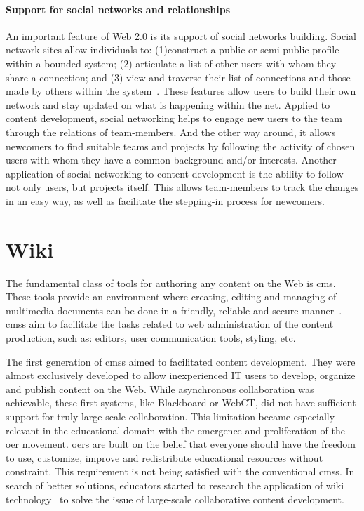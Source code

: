 \documentclass[PhD, Submit, ngerman,UKenglish,table]{scrbook}
\begin{document}
\paragraph{Support for social networks and relationships}
An important feature of Web 2.0 is its support of social networks building.
Social network sites allow individuals to: (1)construct a public or semi-public profile within a bounded system; (2) articulate a list of other users with whom they share a connection; and (3) view and traverse their list of connections and those made by others within the system~\cite{JCC4:JCC4393}.
These features allow users to build their own network and stay updated on what is happening within the net.
Applied to content development, social networking helps to engage new users to the team through the relations of team-members.
And the other way around, it allows newcomers to find suitable teams and projects by following the activity of chosen users with whom they have a common background and/or interests.
Another application of social networking to content development is the ability to follow not only users, but projects itself.
This allows team-members to track the changes in an easy way, as well as facilitate the stepping-in process for newcomers.


\section{Wiki}
\label{sec:wiki}
The fundamental class of tools for authoring any content on the Web is \gls{cms}.
These tools provide an environment where creating, editing and managing of multimedia documents can be done in a friendly, reliable and secure manner~\cite{Rivera2010}.
\gls{cms}s aim to facilitate the tasks related to web administration of the content production, such as: editors, user communication tools, styling, etc.

The first generation of \gls{cms}s aimed to facilitated content development. They were almost exclusively developed to allow inexperienced IT users to develop, organize and publish content on the Web. 
While asynchronous collaboration was achievable, these first systems, like Blackboard or WebCT, did not have sufficient support for truly large-scale collaboration.
This limitation became especially relevant in the educational domain with the emergence and proliferation of the \gls{oer} movement.
\gls{oer}s are built on the belief that everyone should have the freedom to use, customize, improve and redistribute educational resources without constraint. 
This requirement is not being satisfied with the conventional \gls{cms}s.
In search of better solutions, educators started to research the application of wiki technology~\cite{LeufCunningham2001} to solve the issue of large-scale collaborative content development.
\end{document}
